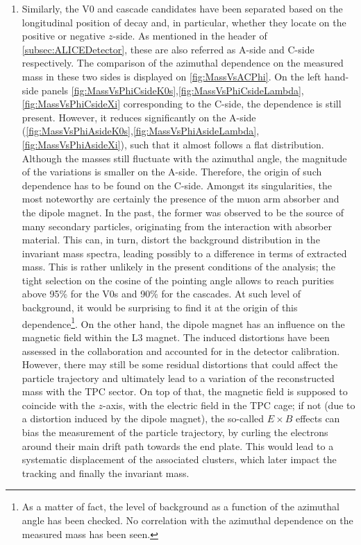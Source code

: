 \begin{enumerate}
\item Similarly, the V0 and cascade candidates have been separated based on the longitudinal position of decay and, in particular, whether they locate on the positive or negative $z$-side. As mentioned in the header of \Sec\ref{subsec:ALICEDetector}, these are also referred as A-side and C-side respectively. The comparison of the azimuthal dependence on the measured mass in these two sides is displayed on \fig\ref{fig:MassVsACPhi}. On the left hand-side panels \figs\ref{fig:MassVsPhiCsideK0s},\ref{fig:MassVsPhiCsideLambda},\ref{fig:MassVsPhiCsideXi} corresponding to the C-side, the dependence is still present. However, it reduces significantly on the A-side (\figs\ref{fig:MassVsPhiAsideK0s},\ref{fig:MassVsPhiAsideLambda},\ref{fig:MassVsPhiAsideXi}), such that it almost follows a flat distribution. Although the \rmKzeroS masses still fluctuate with the azimuthal angle, the magnitude of the variations is smaller on the A-side. Therefore, the origin of such dependence has to be found on the C-side. Amongst its singularities, the most noteworthy are certainly the presence of the muon arm absorber and the dipole magnet. In the past, the former was observed to be the source of many secondary particles, originating from the interaction with absorber material. This can, in turn, distort the background distribution in the invariant mass spectra, leading possibly to a difference in terms of extracted mass. This is rather unlikely in the present conditions of the analysis; the tight selection on the cosine of the pointing angle allows to reach purities above 95\% for the V0s and 90\% for the cascades. At such level of background, it would be surprising to find it at the origin of this dependence\footnote{As a matter of fact, the level of background as a function of the azimuthal angle has been checked. No correlation with the azimuthal dependence on the measured mass has been seen.}. On the other hand, the dipole magnet has an influence on the magnetic field within the L3 magnet. The induced distortions have been assessed in the collaboration and accounted for in the detector calibration. However, there may still be some residual distortions that could affect the particle trajectory and ultimately lead to a variation of the reconstructed mass with the TPC sector. On top of that, the magnetic field is supposed to coincide with the $z$-axis, with the electric field in the TPC cage; if not (due to a distortion induced by the dipole magnet), the so-called $E\times B$ effects can bias the measurement of the particle trajectory, by curling the electrons around their main drift path towards the end plate. This would lead to a systematic displacement of the associated clusters, which later impact the tracking and finally the invariant mass.
\end{enumerate}


